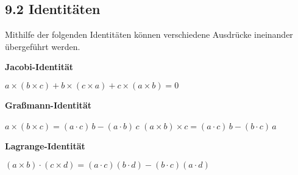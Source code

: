 \subsection{9.2 Identitäten}{
\vskip1pt

Mithilfe der folgenden Identitäten können verschiedene Ausdrücke ineinander übergeführt werden.\par \vskip7pt

\textbf{Jacobi-Identität}\par

\vspace{-1pt}
\begin{center}
$a \times(b \times c) +b \times (c \times a) +c \times (a \times b) = 0$
\end{center}\vskip3pt

\textbf{Graßmann-Identität}\par
\vspace{-1pt}
\begin{center}
$a \times(b \times c) = (a \cdot c)\, b - (a \cdot b)\, c$\vskip2pt
$(a \times b) \times c = (a \cdot c)\, b - (b \cdot c)\, a$
\end{center}\vskip3pt

\textbf{Lagrange-Identität}\par
\vspace{-1pt}
\begin{center}
$(a \times b) \cdot (c \times d) = (a \cdot c) (b \cdot d) - (b \cdot c) (a \cdot d)$
\end{center}\vspace{-3pt}

}
\colbreak
